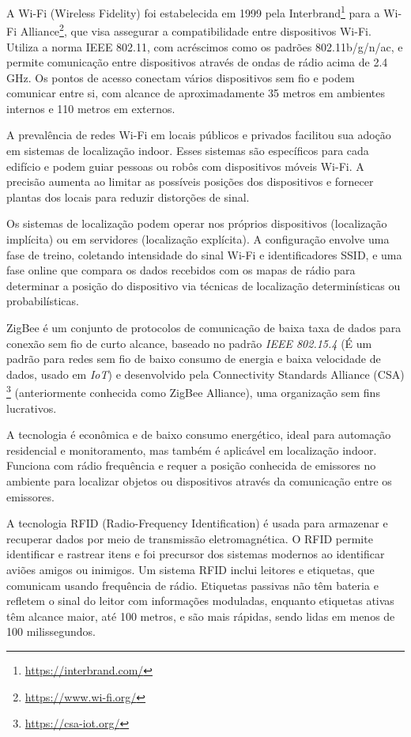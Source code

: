 \label{subsubsubsec:wifi}
A Wi-Fi (Wireless Fidelity) foi estabelecida em 1999 pela Interbrand\footnote{\url{https://interbrand.com/}} para a Wi-Fi Alliance\footnote{\url{https://www.wi-fi.org/}}, que visa assegurar a compatibilidade entre dispositivos Wi-Fi. Utiliza a norma IEEE 802.11, com acréscimos como os padrões 802.11b/g/n/ac, e permite comunicação entre dispositivos através de ondas de rádio acima de 2.4 GHz. Os pontos de acesso conectam vários dispositivos sem fio e podem comunicar entre si, com alcance de aproximadamente 35 metros em ambientes internos e 110 metros em externos.

A prevalência de redes Wi-Fi em locais públicos e privados facilitou sua adoção em sistemas de localização indoor.
Esses sistemas são específicos para cada edifício e podem guiar pessoas ou robôs com dispositivos móveis Wi-Fi. A precisão aumenta ao limitar as possíveis posições dos dispositivos e fornecer plantas dos locais para reduzir distorções de sinal.

Os sistemas de localização podem operar nos próprios dispositivos (localização implícita) ou em servidores (localização explícita).
A configuração envolve uma fase de treino, coletando intensidade do sinal Wi-Fi e identificadores SSID, e uma fase online que compara os dados recebidos com os mapas de rádio para determinar a posição do dispositivo via técnicas de localização determinísticas ou probabilísticas.

\label{subsubsubsec:zigbee}
ZigBee é um conjunto de protocolos de comunicação de baixa taxa de dados para conexão sem fio de curto alcance, baseado no padrão \textit{IEEE 802.15.4} (É um padrão para redes sem fio de baixo consumo de energia e baixa velocidade de dados, usado em \textit{IoT}) e desenvolvido pela Connectivity Standards Alliance (CSA) \footnote{\url{https://csa-iot.org/}} (anteriormente conhecida como ZigBee Alliance), uma organização sem fins lucrativos.

A tecnologia é econômica e de baixo consumo energético, ideal para automação residencial e monitoramento, mas também é aplicável em localização indoor.
Funciona com rádio frequência e requer a posição conhecida de emissores no ambiente para localizar objetos ou dispositivos através da comunicação entre os emissores.

\label{subsubsubsec:rfid}
A tecnologia RFID (Radio-Frequency Identification) é usada para armazenar e recuperar dados por meio de transmissão eletromagnética.
O RFID permite identificar e rastrear itens e foi precursor dos sistemas modernos ao identificar aviões amigos ou inimigos.
Um sistema RFID inclui leitores e etiquetas, que comunicam usando frequência de rádio.
Etiquetas passivas não têm bateria e refletem o sinal do leitor com informações moduladas, enquanto etiquetas ativas têm alcance maior, até 100 metros, e são mais rápidas, sendo lidas em menos de 100 milissegundos.

